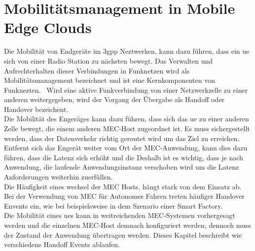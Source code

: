 \documentclass[runningheads]{llncs}
\numberwithin{figure}{section}
\begin{document}
\newpage

\section{Mobilitätsmanagement in Mobile Edge Clouds}
\label{sec:Mobilitätsmanagement}
Die Mobilität von Endgeräte im \acrshort{3gpp} Neztwerken, kann dazu führen, dass ein \acrshort{ue} sich von einer 
Radio Station zu nächsten bewegt. Das Verwalten und Aufrechterhalten dieser Verbindungen in Funknetzen wird
als Mobilitätsmanagement bezeichnet und ist eine Kernkomponenten von Funknezten. 
Wird eine aktive Funkverbindung von einer Netzwerkzelle zu einer anderen weitergegeben, wird der Vorgang
der Übergabe als Handoff oder Handover bezeichent.\\
Die Mobilität des Engeräges kann dazu führen, 
dass sich das \acrshort{ue} zu einer anderen Zelle bewegt, 
die einem anderen MEC-Host zugeordnet ist. Es muss sichergestellt werden, dass der Datenverkehr
richtig geroutet wird um das Ziel zu erreichen.
Entfernt sich das Engerät weiter vom Ort der MEC-Anwendung, 
kann dies dazu führen, dass die Latenz sich erhöht und die Deshalb ist es wichtig, dass je nach Anwendung,
die laufende Anwendungsinstanz verschoben wird um die Latenz Anforderungen weiterhin zuerfüllen. \\
Die Häufigkeit eines wechsel der MEC Hosts, hängt stark von dem 
Einsatz ab. Bei der Verwendung von MEC für Autonomes Fahren treten häufiger Handover Envents ein, wie bei
beispielsweise in dem Szenario einer Smart Factory.\\
Die Mobilität eines \acrshort{ue}s kann in weitreichenden MEC-Systemen vorhergesagt werden und die einzelnen MEC-Host demnach konfiguriert werden,
dennoch muss der Zustand der Anwendung übertragen werden.
Dieses Kapitel beschreibt wie verschiedene Handoff Events ablaufen.
\end{document}

